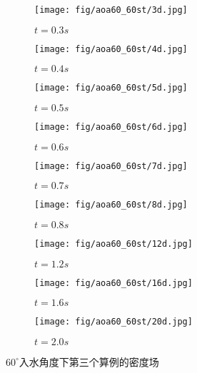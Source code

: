 \begin{figure}[!htp]
  \centering

  \begin{subfigure}{0.25\textwidth}
    \centering
    \texttt{[image: fig/aoa60\_60st/3d.jpg]}
    \caption{$t = 0.3s$}
  \end{subfigure}
  \hspace{1cm}
  \begin{subfigure}{0.25\textwidth}
    \centering
    \texttt{[image: fig/aoa60\_60st/4d.jpg]}
    \caption{$t = 0.4s$}
  \end{subfigure}
  \hspace{1cm}
  \begin{subfigure}{0.25\textwidth}
    \centering
    \texttt{[image: fig/aoa60\_60st/5d.jpg]}
    \caption{$t = 0.5s$}
  \end{subfigure}

  \quad

  \begin{subfigure}{0.25\textwidth}
    \centering
    \texttt{[image: fig/aoa60\_60st/6d.jpg]}
    \caption{$t = 0.6s$}
  \end{subfigure}
  \hspace{1cm}
  \begin{subfigure}{0.25\textwidth}
    \centering
    \texttt{[image: fig/aoa60\_60st/7d.jpg]}
    \caption{$t = 0.7s$}
  \end{subfigure}
  \hspace{1cm}
  \begin{subfigure}{0.25\textwidth}
    \centering
    \texttt{[image: fig/aoa60\_60st/8d.jpg]}
    \caption{$t = 0.8s$}
  \end{subfigure}

  \quad 

  \begin{subfigure}{0.25\textwidth}
    \centering
    \texttt{[image: fig/aoa60\_60st/12d.jpg]}
    \caption{$t = 1.2s$}
  \end{subfigure}
  \hspace{1cm}
  \begin{subfigure}{0.25\textwidth}
    \centering
    \texttt{[image: fig/aoa60\_60st/16d.jpg]}
    \caption{$t = 1.6s$}
  \end{subfigure}
  \hspace{1cm}
  \begin{subfigure}{0.25\textwidth}
    \centering
    \texttt{[image: fig/aoa60\_60st/20d.jpg]}
    \caption{$t = 2.0s$}
  \end{subfigure}

  \caption{$60^\circ$入水角度下第三个算例的密度场}
  \label{fig:detail_d}
\end{figure}

